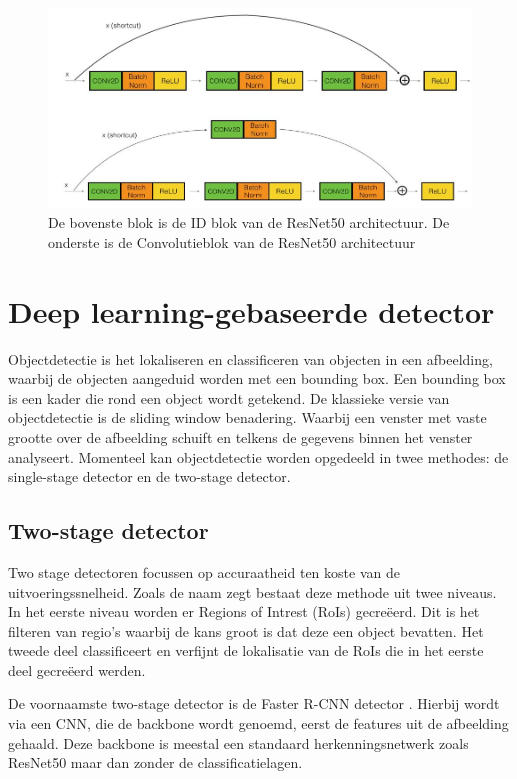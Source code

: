 \begin{figure}[!ht]
	\centering
	\includegraphics[width=1.0\linewidth]{fig/resnet_blokken.jpg}
	\caption{De bovenste blok is de ID blok van de ResNet50 architectuur. De onderste is de Convolutieblok van de ResNet50 architectuur}
	\label{fig:resnet_b}
\end{figure}

\section{Deep learning-gebaseerde detector}
Objectdetectie is het lokaliseren en classificeren van objecten in een afbeelding, waarbij de objecten aangeduid worden met een bounding box.
Een bounding box is een kader die rond een object wordt getekend. 
De klassieke versie van objectdetectie is de sliding window benadering.
Waarbij een venster met vaste grootte over de afbeelding schuift en telkens de gegevens binnen het venster analyseert.
Momenteel kan objectdetectie worden opgedeeld in twee methodes: de single-stage detector en de two-stage detector.

\subsection{Two-stage detector}
Two stage detectoren focussen op accuraatheid ten koste van de uitvoeringssnelheid.
Zoals de naam zegt bestaat deze methode uit twee niveaus. 
In het eerste niveau worden er Regions of Intrest (RoIs) gecre\"eerd.
Dit is het filteren van regio's waarbij de kans groot is dat deze een object bevatten. 
Het tweede deel classificeert en verfijnt de lokalisatie van de RoIs die in het eerste deel gecre\"eerd werden. 

De voornaamste two-stage detector is de Faster R-CNN detector \cite{ren_faster_2016}. 
Hierbij wordt via een CNN, die de backbone wordt genoemd, eerst de features uit de afbeelding gehaald.
Deze backbone is meestal een standaard herkenningsnetwerk zoals ResNet50 maar dan zonder de classificatielagen.

